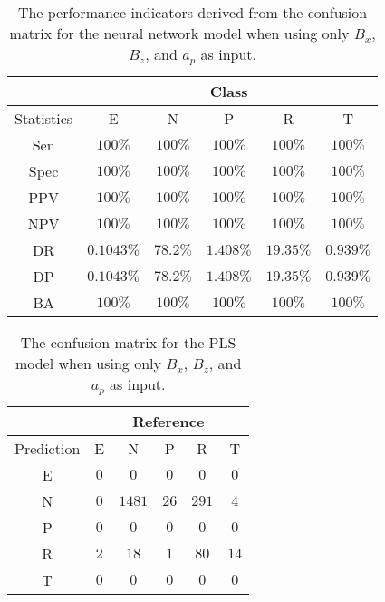 \begin{table}[!ht]
	\centering
	\begin{tabular}{|c|c|c|c|c|c|}
		\hline
		 & \multicolumn{5}{c|}{Class} \\ \hline
		Statistics & E & N & P & R & T \\ \hline
		Sen & $100\%$ & $100\%$ & $100\%$ & $100\%$ & $100\%$ \\ \hline
		Spec & $100\%$ & $100\%$ & $100\%$ & $100\%$ & $100\%$ \\ \hline
		PPV & $100\%$ & $100\%$ & $100\%$ & $100\%$ & $100\%$ \\ \hline
		NPV & $100\%$ & $100\%$ & $100\%$ & $100\%$ & $100\%$ \\ \hline
		DR & $0.1043\%$ & $78.2\%$ & $1.408\%$ & $19.35\%$ & $0.939\%$ \\ \hline
		DP & $0.1043\%$ & $78.2\%$ & $1.408\%$ & $19.35\%$ & $0.939\%$ \\ \hline
		BA & $100\%$ & $100\%$ & $100\%$ & $100\%$ & $100\%$ \\ \hline
	\end{tabular}
	\caption{The performance indicators derived from the confusion matrix for the neural network model when using only $B_{x}$, $B_{z}$, and $a_{p}$ as input.}
	\label{tab:cs:reverse:xzap:nnet}
\end{table}

\begin{table}[!ht]
	\centering
	\begin{tabular}{|c|c|c|c|c|c|}
		\hline
		 & \multicolumn{5}{|c|}{Reference} \\ \hline
		 Prediction & E & N & P & R & T \\ \hline
		 E & $0$ & $0$ & $0$ & $0$ & $0$ \\ \hline
		 N & $0$ & $1481$ & $26$ & $291$ & $4$ \\ \hline
		 P & $0$ & $0$ & $0$ & $0$ & $0$ \\ \hline
		 R & $2$ & $18$ & $1$ & $80$ & $14$ \\ \hline
		 T & $0$ & $0$ & $0$ & $0$ & $0$ \\ \hline
	\end{tabular}
	\caption{The confusion matrix for the PLS model when using only $B_{x}$, $B_{z}$, and $a_{p}$ as input.}
	\label{tab:cm:xzap:pls}
\end{table}

